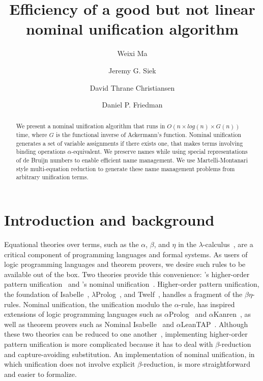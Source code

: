 \documentclass[a4paper,UKenglish]{lipics-v2016}
\title{Efficiency of a good but not linear nominal unification algorithm}
\author[1]{Weixi Ma}
\author[2]{Jeremy G. Siek}
\author[3]{David Thrane Christiansen}
\author[4]{Daniel P. Friedman}
\affil[1]{Indiana University,
\texttt{mvc@iu.edu}}
\affil[2]{Indiana University,
\texttt{jsiek@indiana.edu}}
\affil[3]{Galois, Inc.,
\texttt{dtc@galois.com}}
\affil[4]{Indiana University,
\texttt{dfried@indiana.edu}}
\begin{document}
\maketitle

\begin{abstract}
We present a nominal unification algorithm that runs in $O(n \times
log(n) \times G(n))$ time, where $G$ is the functional inverse of
Ackermann's function. Nominal unification generates a set of
variable assignments if there exists one, that makes terms
involving binding operations $\alpha$-equivalent. We preserve names
while using special representations of de Bruijn numbers
to enable efficient name management.
We use Martelli-Montanari style multi-equation reduction
to generate these name management problems from arbitrary unification terms.
\end{abstract}

\section{Introduction and background}

Equational theories over terms, such as the $\alpha$, $\beta$, and $\eta$
in the $\lambda$-calculus~\citep{church_calculi_1941}, are
a critical component of
programming languages and formal systems. As users of logic
programming languages and theorem provers, we desire such rules to be
available out of the box. Two theories provide
this convenience: \citeauthor{miller_logic_1989}'s higher-order pattern
unification~\citep{miller_logic_1989} and \citeauthor{urban_nominal_2004}'s
nominal unification~\citep{urban_nominal_2004}.
Higher-order pattern unification, the foundation of
Isabelle~\citep{paulson_natural_1986},
$\lambda$Prolog~\citep{nadathur_overview_1988}, and
Twelf~\citep{pfenning_system_1999},
handles a fragment of the $\beta\eta$-rules.
Nominal unification, the unification modulo the $\alpha$-rule,
has inspired extensions of logic
programming languages such as $\alpha$Prolog~\citep{cheney_prolog:_2004}
and $\alpha$Kanren~\citep{byrd_kanren_2007}, as well as theorem
provers such as Nominal Isabelle~\citep{urban_nominal_2005} and
$\alpha$LeanTAP~\citep{near_leantap:_2008}. Although these two
theories can be reduced to one another~\citep{cheney_relating_2005,
levy_nominal_2012}, implementing higher-order pattern unification is
more complicated because it has to deal with $\beta$-reduction and
capture-avoiding substitution. An implementation of nominal unification,
in which unification does not involve explicit $\beta$-reduction,
is more straightforward and easier to formalize.
\end{document}
